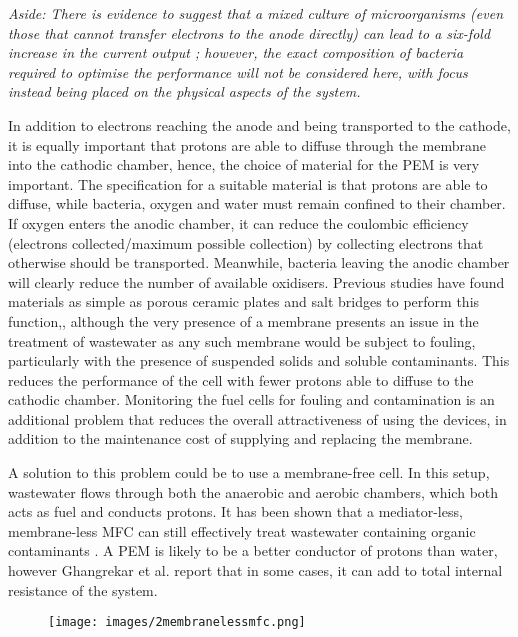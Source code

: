 \documentclass[12pt]{article}
\begin{document}
\textsl{Aside: There is evidence to suggest that a mixed culture of microorganisms (even those that cannot transfer electrons to the anode directly) can lead to a six-fold increase in the current output \cite{ghangrekar2006microbial}; however, the exact composition of bacteria required to optimise the performance will not be considered here, with focus instead being placed on the physical aspects of the system.}


In addition to electrons reaching the anode and being transported to the cathode, it is equally important that protons are able to diffuse through the membrane into the cathodic chamber, hence, the choice of material for the PEM is very important. The specification for a suitable material is that protons are able to diffuse, while bacteria, oxygen and water must remain confined to their chamber. If oxygen enters the anodic chamber, it can reduce the coulombic efficiency (electrons collected/maximum possible collection) by collecting electrons that otherwise should be transported.\cite{logan2006microbial} Meanwhile, bacteria leaving the anodic chamber will clearly reduce the number of available oxidisers. Previous studies have found materials as simple as porous ceramic plates and salt bridges to perform this function,\cite{min2005electricity}, although the very presence of a membrane presents an issue in the treatment of wastewater as any such membrane would be subject to fouling, particularly with the presence of suspended solids and soluble contaminants. This reduces the performance of the cell with fewer protons able to diffuse to the cathodic chamber.\cite{xu2012fouling} Monitoring the fuel cells for fouling and contamination is an additional problem that reduces the overall attractiveness of using the devices, in addition to the maintenance cost of supplying and replacing the membrane.


A solution to this problem could be to use a membrane-free cell. In this setup, wastewater flows through both the anaerobic and aerobic chambers, which both acts as fuel and conducts protons. It has been shown that a mediator-less, membrane-less MFC can still effectively treat wastewater containing organic contaminants \cite{jang2004construction} \cite{logan2005simultaneous}. A PEM is likely to be a better conductor of protons than water, however Ghangrekar et al.\cite{ghangrekar2006wastewater} report that in some cases, it can add to total internal resistance of the system.

\begin{figure}
\centering
\texttt{[image: images/2membranelessmfc.png]}
\caption{\cite{ghangrekar2007performance}}
\label{fig:2membranelessmfc}
\end{figure}
\end{document}
